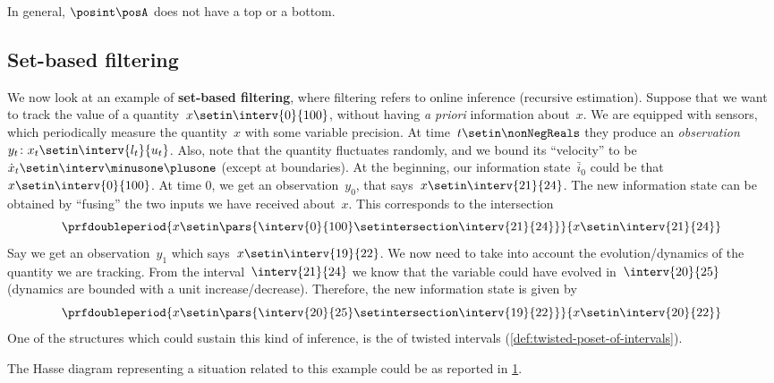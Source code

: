 In general, $\posint\posA$ does not have a top or a bottom.

\vfill
\clearpage

\subsection{Set-based filtering}
We now look at an example of \textbf{set-based filtering}, where filtering refers to online inference (recursive estimation).
Suppose that we want to track the value of a quantity~$x\setin \interv{0}{100}$, without having \emph{a priori} information about~$x$.
We are equipped with sensors, which periodically measure the quantity~$x$ with some variable precision.
At time~$t\setin \nonNegReals$ they produce an \emph{observation}~$y_t\colon x_t\setin \interv{l_t}{u_t}$.
Also, note that the quantity fluctuates randomly, and we bound its ``velocity'' to be~$\dot{x}_t\setin \interv\minusone\plusone$ (except at boundaries).
At the beginning, our information state~$\bar{i}_0$ could be that~$x\setin \interv{0}{100}$.
At time 0, we get an observation~$y_0$, that says~$x\setin \interv{21}{24}$.
The new information state can be obtained by ``fusing'' the two inputs we have received about~$x$.
This corresponds to the intersection
\begin{equation}\label{eq:filtering-2}
    \prfdoubleperiod{
        x\setin \pars{ \interv{0}{100} \setintersection \interv{21}{24}}
    }{
        x\setin \interv{21}{24}
    }
\end{equation}
Say we get an observation~$y_1$ which says~$x\setin \interv{19}{22}$.
We now need to take into account the evolution/dynamics of the quantity we are tracking.
From the interval~$\interv{21}{24}$ we know that the variable could have evolved in~$\interv{20}{25}$ (dynamics are bounded with a unit increase/decrease).
Therefore, the new information state is given by
\begin{equation}\label{eq:filtering-3}
    \prfdoubleperiod{
        x\setin \pars{ \interv{20}{25} \setintersection \interv{19}{22}}
    }{
        x\setin \interv{20}{22}
    }
\end{equation}
One of the structures which could sustain this kind of inference, is the  of twisted intervals (\cref{def:twisted-poset-of-intervals}).

The Hasse diagram representing a situation related to this example could be as reported in \cref{fig:hasse_filtering}.
\begin{figure}[h!]
    \centering
    \caption{}
    \label{fig:hasse_filtering}
\end{figure}
